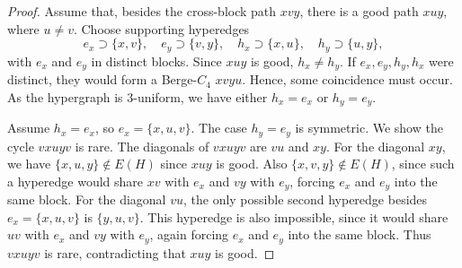 \documentclass[10pt,a4paper]{amsart}
\begin{document}
\begin{proof}
Assume that, besides the cross-block path $xvy$, there is a good path $xuy$,
where $u\ne v$.  Choose supporting hyperedges
\[
e_x\supset\{x,v\},\quad e_y\supset\{v,y\},\quad
h_x\supset\{x,u\},\quad h_y\supset\{u,y\},
\]
with $e_x$ and $e_y$ in distinct blocks.  Since $xuy$ is good, $h_x\ne h_y$.
If $e_x,e_y,h_y,h_x$ were distinct, they would form a Berge-$C_4$  $xvyu$.  Hence, some coincidence must occur. As the hypergraph is $3$-uniform, we have either $h_x=e_x$ or $h_y=e_y$.


Assume \(h_x=e_x\), so \(e_x=\{x,u,v\}\). The case \(h_y=e_y\) is symmetric.
We show the cycle \(vxuyv\) is rare. 
The diagonals of \(vxuyv\) are \(vu\) and \(xy\). For the diagonal \(xy\), we have
\(\{x,u,y\}\notin E(H)\) since \(xuy\) is good. Also
\(\{x,v,y\}\notin E(H)\), since such a hyperedge would share \(xv\) with
\(e_x\) and \(vy\) with \(e_y\), forcing \(e_x\) and \(e_y\) into the same block.
For the diagonal \(vu\), the only possible second hyperedge besides
\(e_x=\{x,u,v\}\) is \(\{y,u,v\}\). This hyperedge is also impossible, since it
would share \(uv\) with \(e_x\) and \(vy\) with \(e_y\), again forcing \(e_x\)
and \(e_y\) into the same block. Thus \(vxuyv\) is rare, contradicting that \(xuy\) is good.

\end{proof}
\end{document}
